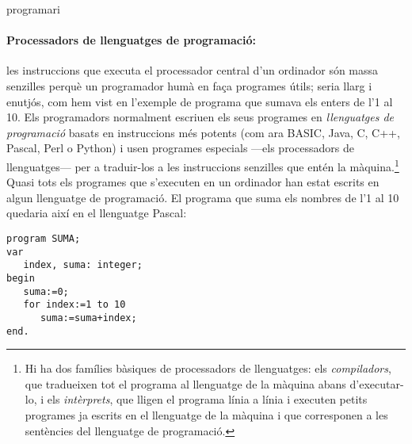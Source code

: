 \begin{persabermes}{programari}
\paragraph{Processadors de llenguatges de programació:} les
instruccions que executa el processador central d'un ordinador són
massa senzilles perquè un programador humà en faça programes útils;
seria llarg i enutjós, com hem vist en l'exemple de programa que
sumava els enters de l'1 al 10.  Els programadors normalment escriuen
els seus programes en {\em llenguatges de programació} basats en
instruccions més potents (com ara BASIC, Java, C, C++, Pascal, Perl o
Python) i usen programes especials ---els processadors de
llenguatges--- per a traduir-los a les instruccions senzilles que
entén la màquina.\footnote{Hi ha dos famílies bàsiques de processadors
  de llenguatges: els \emph{compiladors}, que tradueixen tot el
  programa al llenguatge de la màquina abans d'executar-lo, i els
  \emph{intèrprets}, que lligen el programa línia a línia i executen
  petits programes ja escrits en el llenguatge de la màquina i que
  corresponen a les sentències del llenguatge de programació.} Quasi
tots els programes que s'executen en un ordinador han estat escrits en
algun llenguatge de programació. El programa que suma els nombres de
l'1 al 10 quedaria així en el llenguatge Pascal:
\begin{verbatim}
program SUMA;
var
   index, suma: integer;
begin
   suma:=0;
   for index:=1 to 10
      suma:=suma+index;
end.
\end{verbatim}



\end{persabermes}
